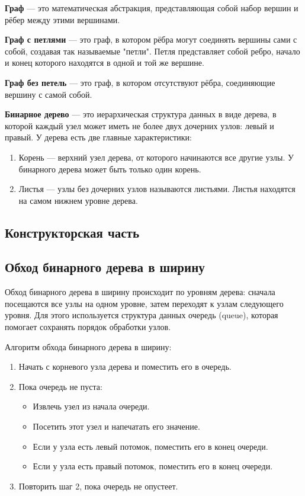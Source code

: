 \documentclass[12pt, a4paper]{article}
\begin{document}
\textbf{Граф} --- это математическая абстракция, представляющая собой набор вершин и рёбер между этими вершинами.

\textbf{Граф с петлями} --- это граф, в котором рёбра могут соединять вершины сами с собой, создавая так называемые "петли". Петля представляет собой ребро, начало и конец которого находятся в одной и той же вершине.

\textbf{Граф без петель} --- это граф, в котором отсутствуют рёбра, соединяющие вершину с самой собой.

\textbf{Бинарное дерево} --- это иерархическая структура данных в виде дерева, в которой каждый узел может иметь не более двух дочерних узлов: левый и правый. У дерева есть две главные характеристики:
\begin{enumerate}
    \item Корень --- верхний узел дерева, от которого начинаются все другие узлы. У бинарного дерева может быть только один корень.
    \item Листья --- узлы без дочерних узлов называются листьями. Листья находятся на самом нижнем уровне дерева.
\end{enumerate}

\newpage
\begin{center}
    \section{Конструкторская часть}
\end{center}
\subsection{Обход бинарного дерева в ширину}
Обход бинарного дерева в ширину происходит по уровням дерева: сначала посещаются все узлы на одном уровне, затем переходят к узлам следующего уровня. Для этого используется структура данных очередь (queue), которая помогает сохранять порядок обработки узлов.

Алгоритм обхода бинарного дерева в ширину:
\begin{enumerate}
    \item Начать с корневого узла дерева и поместить его в очередь.
    \item Пока очередь не пуста:
    \begin{itemize}
        \item[---] Извлечь узел из начала очереди.
        \item[---] Посетить этот узел и напечатать его значение.
        \item[---] Если у узла есть левый потомок, поместить его в конец очереди.
        \item[---] Если у узла есть правый потомок, поместить его в конец очереди.
    \end{itemize}
    \item Повторить шаг 2, пока очередь не опустеет.
\end{enumerate}
\end{document}
